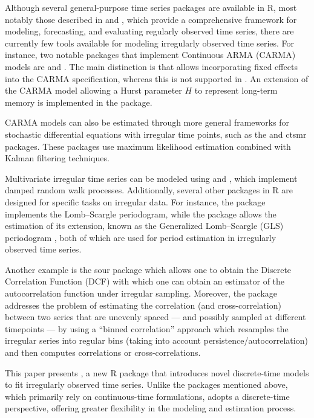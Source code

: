 Although several general-purpose time series packages are available in R, most notably those described in \citet{HyndmanAthanasopoulosBergmeirCaceresChhayOHaraWildPetropoulosRazbashWangYasmeen2026} and \citet{HyndmanKhandakar2008}, which provide a comprehensive framework for modeling, forecasting, and evaluating regularly observed time series, there are currently few tools available for modeling irregularly observed time series. For instance, two notable packages that implement Continuous ARMA (CARMA) models are  and  \citep{Yuima_2014}. The main distinction is that  allows incorporating fixed effects into the CARMA specification, whereas this is not supported in . An extension of the CARMA model allowing a Hurst parameter \(H\) to represent long-term memory is implemented in the  package.

CARMA models can also be estimated through more general frameworks for stochastic differential equations with irregular time points, such as the  \citep{sde_2008} and ctsmr \citep{ctsmr_2016} packages. These packages use maximum likelihood estimation combined with Kalman filtering techniques.

Multivariate irregular time series can be modeled using  and , which implement damped random walk processes. Additionally, several other packages in R are designed for specific tasks on irregular data.
For instance, the  package \citep{Lomb} implements the Lomb--Scargle periodogram, while the  package \citep{RobPer} allows the estimation of its extension, known as the Generalized Lomb--Scargle (GLS) periodogram \citep{GLS}, both of which are used for period estimation in irregularly observed time series.

Another example is the sour package \citep{sour} which allows one to obtain the Discrete Correlation Function (DCF) with which one can obtain an estimator of the autocorrelation function under irregular sampling. Moreover, the package  \citep{PolancoMedinaMartinGoniMudelsee2019} addresses the problem of estimating the correlation (and cross-correlation) between two series that are unevenly spaced --- and possibly sampled at different timepoints --- by using a ``binned correlation'' approach which resamples the irregular series into regular bins (taking into account persistence/autocorrelation) and then computes correlations or cross-correlations.

This paper presents , a new R package that introduces novel discrete-time models to fit irregularly observed time series. Unlike the packages mentioned above, which primarily rely on continuous-time formulations,  adopts a discrete-time perspective, offering greater flexibility in the modeling and estimation process.

